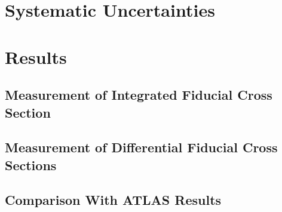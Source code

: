 \documentclass[
12pt, %
english, %
singlespacing, %
liststotoc, %
headsepline, %
]{MastersDoctoralThesis} %
\begin{document}
\section{Systematic Uncertainties}\label{sec:Systematics}\label{sec:Systematics}
         \section{Results}\label{sec:Results} %
    \subsection{Measurement of Integrated Fiducial Cross Section}\label{sec:ResultsInclusiveXS}
    \subsection{Measurement of Differential Fiducial Cross Sections}\label{sec:ResultsDifferentialXS}
      
     \subsection{Comparison With ATLAS Results}\label{sec:atlas_results}  %
      


\end{document}
